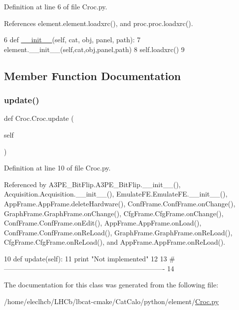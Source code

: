 Definition at line 6 of file Croc.\+py.



References element.\+element.\+loadxrc(), and proc.\+proc.\+loadxrc().


\begin{DoxyCode}
6     \textcolor{keyword}{def }\hyperlink{classwrapper_1_1ModuleDictWrapper_a9a7a794150502f51df687831583e13b9}{\_\_init\_\_}(self, cat, obj, panel, path):
7         element.\_\_init\_\_(self,cat,obj,panel,path)
8         self.loadxrc()
9 
\end{DoxyCode}


\subsection{Member Function Documentation}
\mbox{\label{classCroc_1_1Croc_ae4ec968c843b562cf39bb95246353a79}} 
\subsubsection{\texorpdfstring{update()}{update()}}
{\footnotesize\ttfamily def Croc.\+Croc.\+update (\begin{DoxyParamCaption}\item[{}]{self }\end{DoxyParamCaption})}



Definition at line 10 of file Croc.\+py.



Referenced by A3\+P\+E\+\_\+\+Bit\+Flip.\+A3\+P\+E\+\_\+\+Bit\+Flip.\+\_\+\+\_\+init\+\_\+\+\_\+(), Acquisition.\+Acquisition.\+\_\+\+\_\+init\+\_\+\+\_\+(), Emulate\+F\+E.\+Emulate\+F\+E.\+\_\+\+\_\+init\+\_\+\+\_\+(), App\+Frame.\+App\+Frame.\+delete\+Hardware(), Conf\+Frame.\+Conf\+Frame.\+on\+Change(), Graph\+Frame.\+Graph\+Frame.\+on\+Change(), Cfg\+Frame.\+Cfg\+Frame.\+on\+Change(), Conf\+Frame.\+Conf\+Frame.\+on\+Edit(), App\+Frame.\+App\+Frame.\+on\+Load(), Conf\+Frame.\+Conf\+Frame.\+on\+Re\+Load(), Graph\+Frame.\+Graph\+Frame.\+on\+Re\+Load(), Cfg\+Frame.\+Cfg\+Frame.\+on\+Re\+Load(), and App\+Frame.\+App\+Frame.\+on\+Re\+Load().


\begin{DoxyCode}
10     \textcolor{keyword}{def }update(self):
11         \textcolor{keywordflow}{print} \textcolor{stringliteral}{"Not implemented"}
12 
13 \textcolor{comment}{#----------------------------------------------------------------------}
14 
\end{DoxyCode}


The documentation for this class was generated from the following file\+:\begin{DoxyCompactItemize}
\item 
/home/eleclhcb/\+L\+H\+Cb/lbcat-\/cmake/\+Cat\+Calo/python/element/\hyperlink{Croc_8py}{Croc.\+py}\end{DoxyCompactItemize}
